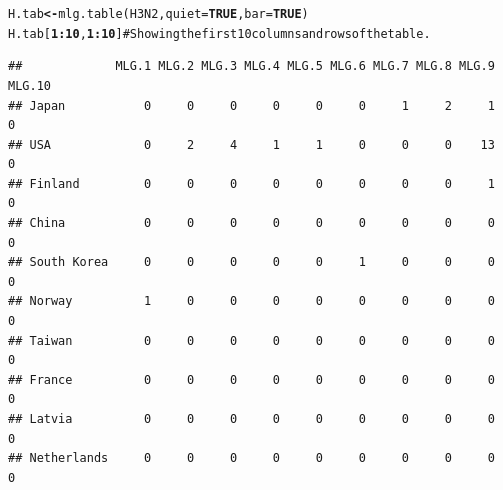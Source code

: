 \documentclass[letterpaper]{article}\usepackage[]{graphicx}\usepackage[]{color}
\makeatletter
\newcommand{\hlnum}[1]{\textcolor[rgb]{0.502,0,0.502}{\textbf{#1}}}%
\newcommand{\hlcom}[1]{\textcolor[rgb]{1,0.502,0}{#1}}%
\newcommand{\hlopt}[1]{\textcolor[rgb]{1,0,0.502}{\textbf{#1}}}%
\newcommand{\hlstd}[1]{\textcolor[rgb]{0,0,0}{#1}}%
\newcommand{\hlkwb}[1]{\textcolor[rgb]{0.502,0.502,0.753}{\textbf{#1}}}%
\newcommand{\hlkwc}[1]{\textcolor[rgb]{0,0.502,0.753}{#1}}%
\newcommand{\hlkwd}[1]{\textcolor[rgb]{0,0.267,0.4}{#1}}%
\newenvironment{kframe}{%
 \def\at@end@of@kframe{}%
 \ifinner\ifhmode%
  \def\at@end@of@kframe{\end{minipage}}%
  \begin{minipage}{\columnwidth}%
 \fi\fi%
 \def\FrameCommand##1{\hskip\@totalleftmargin \hskip-\fboxsep
 \colorbox{shadecolor}{##1}\hskip-\fboxsep
     \hskip-\linewidth \hskip-\@totalleftmargin \hskip\columnwidth}%
 \MakeFramed {\advance\hsize-\width
   \@totalleftmargin\z@ \linewidth\hsize
   \@setminipage}}%
 {\par\unskip\endMakeFramed%
 \at@end@of@kframe}
\newenvironment{knitrout}{}{} %
\makeatother
\begin{document}
\begin{knitrout}\footnotesize
{}\color{fgcolor}\begin{kframe}
\begin{alltt}
\hlstd{H.tab} \hlkwb{<-} \hlkwd{mlg.table}\hlstd{(H3N2,} \hlkwc{quiet} \hlstd{=} \hlnum{TRUE}\hlstd{,} \hlkwc{bar} \hlstd{=} \hlnum{TRUE}\hlstd{)}
\hlstd{H.tab[}\hlnum{1}\hlopt{:}\hlnum{10}\hlstd{,} \hlnum{1}\hlopt{:}\hlnum{10}\hlstd{]}  \hlcom{# Showing the first 10 columns and rows of the table.}
\end{alltt}
\end{kframe}
\end{knitrout}

\begin{knitrout}\footnotesize
{}\color{fgcolor}\begin{kframe}
\begin{verbatim}
##             MLG.1 MLG.2 MLG.3 MLG.4 MLG.5 MLG.6 MLG.7 MLG.8 MLG.9 MLG.10
## Japan           0     0     0     0     0     0     1     2     1      0
## USA             0     2     4     1     1     0     0     0    13      0
## Finland         0     0     0     0     0     0     0     0     1      0
## China           0     0     0     0     0     0     0     0     0      0
## South Korea     0     0     0     0     0     1     0     0     0      0
## Norway          1     0     0     0     0     0     0     0     0      0
## Taiwan          0     0     0     0     0     0     0     0     0      0
## France          0     0     0     0     0     0     0     0     0      0
## Latvia          0     0     0     0     0     0     0     0     0      0
## Netherlands     0     0     0     0     0     0     0     0     0      0
\end{verbatim}
\end{kframe}
\end{knitrout}
\end{document}
